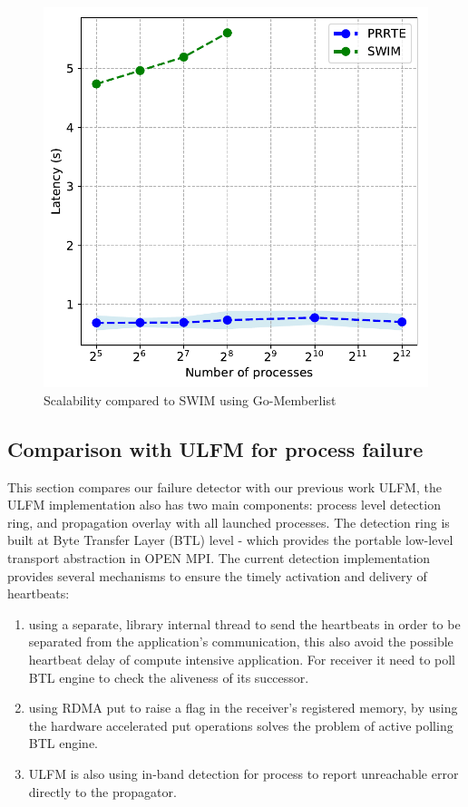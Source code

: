 \documentclass[sigconf]{acmart}
\begin{document}
\begin{figure}[h]
  \centering
  \includegraphics[width=\linewidth]{Scale_prrte_swim.pdf}
  \caption{Scalability compared to SWIM using Go-Memberlist}
\end{figure}

\subsection{Comparison with ULFM for process failure}
This section compares our failure detector with our previous work ULFM\cite{George18}, the ULFM implementation also has two main components: process level detection ring, and propagation overlay with all launched processes. The detection ring is built at Byte Transfer Layer (BTL) level - which provides the portable low-level transport abstraction in OPEN MPI. The current detection implementation provides several mechanisms to ensure the timely activation and delivery of heartbeats:
\begin{enumerate}
  \item using a separate, library internal thread to send the heartbeats in order to be separated from the application's communication, this also avoid the possible heartbeat delay of compute intensive application. For receiver it need to poll BTL engine to check the aliveness of its successor. 
  \item using RDMA put to raise a flag in the receiver's registered memory, by using the hardware accelerated put operations solves the problem of active polling BTL engine. 
  \item ULFM is also using in-band detection for process to report unreachable error directly to the propagator.
\end{enumerate}
\end{document}

